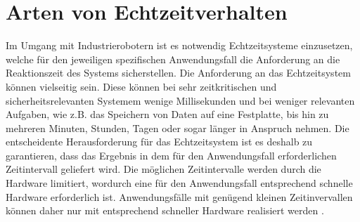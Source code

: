 


\section{Arten von Echtzeitverhalten}
Im Umgang mit Industrierobotern ist es notwendig Echtzeitsysteme einzusetzen, welche für den jeweiligen spezifischen Anwendungsfall die Anforderung an die Reaktionszeit des Systems sicherstellen. Die Anforderung an das Echtzeitsystem können vielseitig sein. Diese können bei sehr zeitkritischen und sicherheitsrelevanten Systemem wenige Millisekunden und bei weniger relevanten Aufgaben, wie z.B. das Speichern von Daten auf eine Festplatte, bis hin zu mehreren Minuten, Stunden, Tagen oder sogar länger in Anspruch nehmen. Die entscheidente Herausforderung für das Echtzeitsystem ist es deshalb zu garantieren, dass das Ergebnis in dem für den Anwendungsfall erforderlichen Zeitintervall geliefert wird. Die möglichen Zeitintervalle werden durch die Hardware limitiert, wordurch eine für den Anwendungsfall entsprechend schnelle Hardware erforderlich ist. Anwendungsfälle mit genügend kleinen Zeitinvervallen können daher nur mit entsprechend schneller Hardware realisiert werden \cite{noauthor_echtzeitsystem_2020}.

